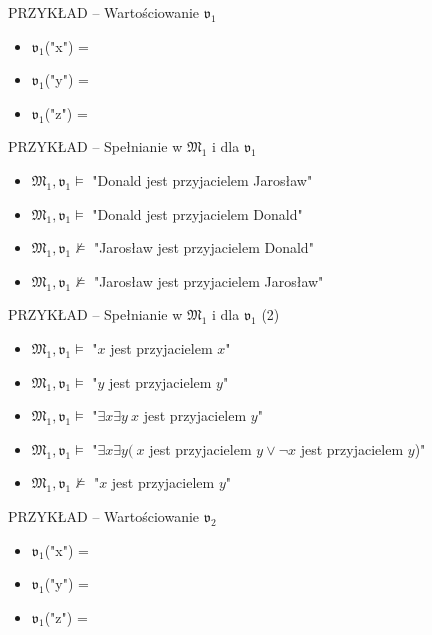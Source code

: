 \documentclass{beamer}
\begin{document}
\begin{frame}{PRZYKŁAD -- Wartościowanie $\mathfrak{v}_1$}
%
\begin{itemize}
\item $\mathfrak{v}_1$("x") = \smiley{}
\item $\mathfrak{v}_1$("y") = \smiley{}
\item $\mathfrak{v}_1$("z") = \smiley{}
\end{itemize}
\end{frame}

\begin{frame}{PRZYKŁAD -- Spełnianie w $\mathfrak{M}_1$ i dla $\mathfrak{v}_1$}
%
\begin{itemize}
\item $\mathfrak{M}_1,\mathfrak{v}_1 \vDash$ "Donald jest przyjacielem Jarosław"%
\item $\mathfrak{M}_1,\mathfrak{v}_1 \vDash$ "Donald jest przyjacielem Donald"%
\item $\mathfrak{M}_1,\mathfrak{v}_1 \not \vDash$ "Jarosław jest przyjacielem Donald"%
\item $\mathfrak{M}_1,\mathfrak{v}_1 \not \vDash$ "Jarosław jest przyjacielem Jarosław"
\end{itemize}
\end{frame}

\begin{frame}{PRZYKŁAD -- Spełnianie w $\mathfrak{M}_1$ i dla $\mathfrak{v}_1$ (2)}
%
\begin{itemize}
\item $\mathfrak{M}_1,\mathfrak{v}_1 \vDash$ "$x$ jest przyjacielem $x$"%
\item $\mathfrak{M}_1,\mathfrak{v}_1 \vDash$ "$y$ jest przyjacielem $y$"%
\item $\mathfrak{M}_1,\mathfrak{v}_1 \vDash$ "$\exists x \exists y ~x$ jest przyjacielem $y$"%
\item $\mathfrak{M}_1,\mathfrak{v}_1 \vDash$ "$\exists x \exists y ( ~x$ jest przyjacielem $y \lor \neg x$ jest przyjacielem $y$)"%
\item $\mathfrak{M}_1,\mathfrak{v}_1 \not \vDash$ "$x$ jest przyjacielem $y$"
\end{itemize}
\end{frame}

\begin{frame}{PRZYKŁAD -- Wartościowanie $\mathfrak{v}_2$}
%
\begin{itemize}
\item $\mathfrak{v}_1$("x") = \smiley{}
\item $\mathfrak{v}_1$("y") = \frownie{}
\item $\mathfrak{v}_1$("z") = \blacksmiley{}
\end{itemize}
\end{frame}
\end{document}
